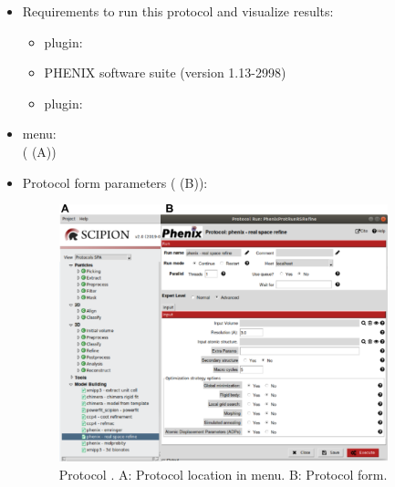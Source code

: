 \begin{itemize}
 \item Requirements to run this protocol and visualize results:
    \begin{itemize}
        \item \scipion plugin: 
        \item PHENIX software suite (version 1.13-2998)
        \item \scipion plugin: 
    \end{itemize}
 \item \scipion menu:\\
   ( (A))
  
 \item Protocol form parameters ( (B)):
  
    \begin{figure}[H]
     \centering 
     \captionsetup{width=.7\linewidth} 
     \includegraphics[width=0.90\textwidth]{Images_appendix/Fig148.pdf}
     \caption{Protocol . A: Protocol location in \scipion menu. B: Protocol form.}
     \label{fig:app_protocol_real_space_refine_1}
    \end{figure}
    

\end{itemize}
